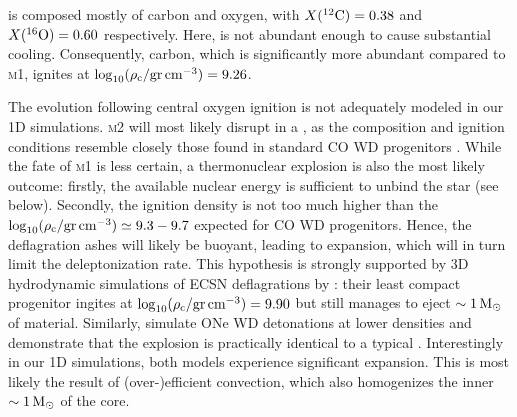 \documentclass[twocolumn,tighten,times]{aastex62}
\begin{document}
 is composed mostly of carbon and oxygen, with $\abun{C}{12}=0.38$ and $\abun{O}{16}=0.60$ respectively. 
 Here,  is not abundant enough to cause  substantial cooling. Consequently, carbon, which is significantly more abundant compared to \textsc{m1}, ignites at $\logrhoc=9.26$. 
 
The evolution following central oxygen ignition is not adequately modeled in our 1D simulations. 
 \textsc{m2} will most likely disrupt in a \ia, as the composition and 
 ignition conditions resemble closely those found in standard CO WD 
 progenitors \citep{Nomoto:1982zz}. While the fate of \textsc{m1} is less 
 certain, a thermonuclear explosion is also the most likely outcome: 
 firstly, the available nuclear energy is sufficient to unbind the star (see 
 below). Secondly, the ignition density is not too much higher than the $\logrhoc\simeq9.3-9.7$ expected for CO WD progenitors. Hence, the 
 deflagration ashes will likely be buoyant, leading to expansion, which will 
 in turn limit the deleptonization rate. This hypothesis is strongly supported
 by 3D hydrodynamic  simulations of ECSN deflagrations by \cite{Jones:2018ule}: their least compact progenitor ingites at $\logrhoc=9.90$ but still manages to eject  $\sim 1\msun$ of material. 
 Similarly,  \cite{marquardt2015} simulate ONe WD detonations at lower 
 densities and demonstrate that the explosion is practically identical to a 
 typical \ia. 
 Interestingly in our 1D simulations, both models experience significant expansion. This is most likely the result of (over-)efficient convection, which also homogenizes the inner $\sim 1\msun$ of the core. 
 
 
 
 
\end{document}

